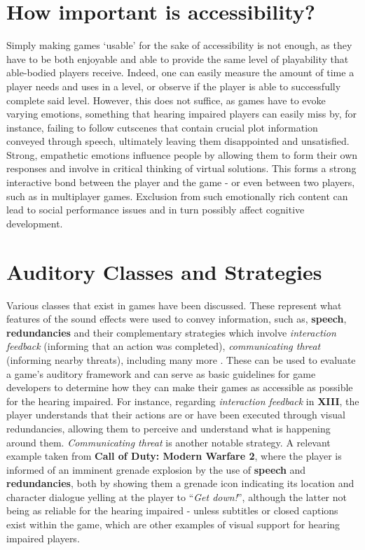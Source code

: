\documentclass{scrartcl}
\begin{document}
\section{How important is accessibility?}
Simply making games `usable' for the sake of accessibility is not enough, as they have to be both enjoyable and able to provide the same level of playability that able-bodied players receive. Indeed, one can easily measure the amount of time a player needs and uses in a level, or observe if the player is able to successfully complete said level. \cite{Arch} However, this does not suffice, as games have to evoke varying emotions, something that hearing impaired players can easily miss by, for instance, failing to follow cutscenes that contain crucial plot information conveyed through speech, ultimately leaving them disappointed and unsatisfied. Strong, empathetic emotions influence people by allowing them to form their own responses and involve in critical thinking of virtual solutions. This forms a strong interactive bond between the player and the game - or even between two players, such as in multiplayer games. Exclusion from such emotionally rich content can lead to social performance issues and in turn possibly affect cognitive development. \cite{Sebanz} \cite{Chartrand} 

\section{Auditory Classes and Strategies}
Various classes that exist in games have been discussed. These represent what features of the sound effects were used to convey information, such as, \textbf{speech}, \textbf{redundancies} and their complementary strategies which involve \textit{interaction feedback} (informing that an action was completed), \textit{communicating threat} (informing nearby threats), including many more \cite{Flav} \cite{Denise}. These can be used to evaluate a game's auditory framework and can serve as basic guidelines for game developers to determine how they can make their games as accessible as possible for the hearing impaired. For instance, regarding \textit{interaction feedback} in \textbf{XIII}, the player understands that their actions are or have been executed through visual redundancies, allowing them to perceive and understand what is happening around them. \textit{Communicating threat} is another notable strategy. A relevant example taken from \textbf{Call of Duty: Modern Warfare 2}, where the player is informed of an imminent grenade explosion by the use of \textbf{speech} and \textbf{redundancies}, both by showing them a grenade icon indicating its location and character dialogue yelling at the player to  ``\textit{Get down!}'', although the latter not being as reliable for the hearing impaired - unless subtitles or closed captions exist within the game, which are other examples of visual support for hearing impaired players. \cite{Denise}
\end{document}
